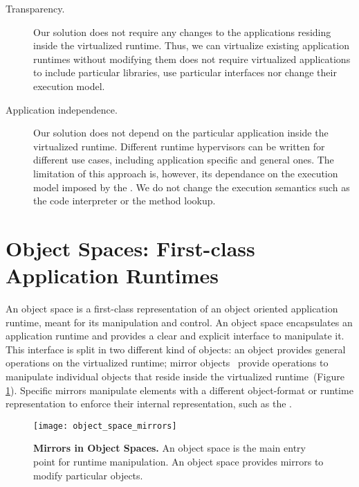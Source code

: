 \begin{description}
\item[Transparency.] Our solution does not require any changes to the applications residing inside the virtualized runtime. Thus, we can virtualize existing application runtimes without modifying them \ie \Vtt does not require virtualized applications to include particular libraries, use particular interfaces nor change their execution model.

\item[Application independence.] Our solution does not depend on the particular application inside the virtualized runtime. Different runtime hypervisors can be written for different use cases, including application specific and general ones. The limitation of this approach is, however, its dependance on the execution model imposed by the \VM. We do not change the \VM execution semantics such as the code interpreter or the method lookup.
\end{description}

\section{Object Spaces: First-class Application Runtimes} \label{sec:object_space}

An object space is a first-class representation of an object oriented application runtime, meant for its manipulation and control. An object space encapsulates an application runtime and provides a clear and explicit interface to manipulate it. This interface is split in two different kind of objects: an  object provides general operations on the virtualized runtime; mirror objects~\cite{Brac04b} provide operations to manipulate individual objects that reside inside the virtualized runtime~(Figure \ref{fig:objectSpaceMirrors}). Specific mirrors manipulate elements with a different object-format or runtime representation to enforce their internal representation, such as the .

\begin{figure}[ht]
\begin{center}
\texttt{[image: object\_space\_mirrors]}
\caption{\textbf{Mirrors in Object Spaces.} An object space is the main entry point for runtime manipulation. An object space provides mirrors to modify particular objects. \label{fig:objectSpaceMirrors}}
\end{center}
\end{figure}


